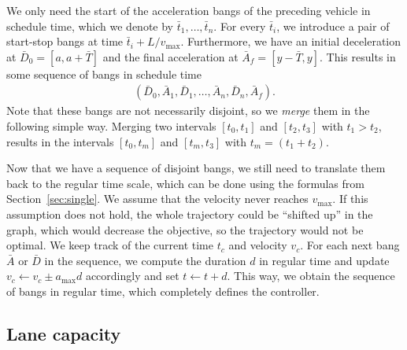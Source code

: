 \documentclass[a4paper]{article}
\theoremstyle{definition}
\theoremstyle{plain}
\begin{document}
We only need the start of the acceleration bangs of the preceding vehicle in
schedule time, which we denote by $\bar{t}_{1}, \dots, \bar{t}_{n}$. For every
$\bar{t}_{i}$, we introduce a pair of start-stop bangs at time
$\bar{t}_{i} + L / v_{\max}$.
%
Furthermore, we have an initial deceleration at $\bar{D}_{0} = [a, a + \bar{T}]$ and the final
acceleration at $\bar{A}_{f} = [y - \bar{T}, y]$.
%
This results in some sequence of bangs in schedule time
\begin{align*}
  (\bar{D}_{0}, \bar{A}_{1}, \bar{D}_{1}, \dots, \bar{A}_{n}, \bar{D}_{n}, \bar{A}_{f}) .
\end{align*}
Note that these bangs are not necessarily disjoint, so we \textit{merge} them in
the following simple way. Merging two intervals $[t_{0}, t_{1}]$ and
$[t_{2}, t_{3}]$ with $t_{1} > t_{2}$, results in the intervals $[t_{0}, t_{m}]$
and $[t_{m}, t_{3}]$ with $t_{m} = (t_{1} + t_{2})$.


Now that we have a sequence of disjoint bangs, we still need to translate them
back to the regular time scale, which can be done using the formulas from
Section~\ref{sec:single}.
%
We assume that the velocity never reaches $v_{\max}$. If this assumption does
not hold, the whole trajectory could be ``shifted up'' in the graph, which would
decrease the objective, so the trajectory would not be optimal. We keep track of
the current time $t_{c}$ and velocity $v_{c}$. For each next bang $\bar{A}$ or
$\bar{D}$ in the sequence, we compute the duration $d$ in regular time and
update $v_{c} \leftarrow v_{c} \pm a_{\max} d$ accordingly and set
$t \leftarrow t + d$. This way, we obtain the sequence of bangs in regular time,
which completely defines the controller.


\subsection{Lane capacity}\label{sec:capacity}
\end{document}
